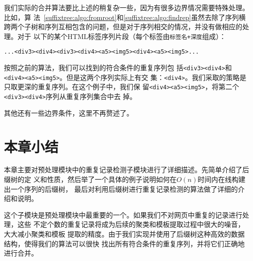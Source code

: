 我们实际的合并算法要比上述的稍复杂一些，因为有很多边界情况需要特殊处理。比如，算
法~\ref{suffixtree:algo:fromroot}和\ref{suffixtree:algo:findrep}虽然去除了序列横
跨两个子树和序列互相包含的问题，但是对于序列相交的情况，并没有做相应的处理。对于
以下的某个HTML标签序列片段（每个标签由\texttt{标签名+深度}组成）：
\begin{verbatim}
...<div3><div4><div3><div4><a5><img5><div4><a5><img5>...
\end{verbatim}
按照之前的算法，我们可以找到的符合条件的重复序列包
括\texttt{<div3><div4>}和\texttt{<div4><a5><img5>}。但是这两个序列实际上有交
集：\texttt{<div4>}。我们采取的策略是只取更深的重复序列。在这个例子中，我们保
留\texttt{<div4><a5><img5>}，将第二个\texttt{<div3><div4>}序列从重复序列集合中去
掉。

其他还有一些边界条件，这里不再赘述了。

\section{本章小结}
\label{sec:summarysuffixtree}
本章主要对预处理模块中的重复记录检测子模块进行了详细描述。先简单介绍了后缀树的定
义和性质，然后举了一个具体的例子说明如何在$O(n)$时间内在线构建出一个序列的后缀树，
最后对利用后缀树进行重复记录检测的算法做了详细的介绍和说明。

这个子模块是预处理模块中最重要的一个。如果我们不对网页中重复的记录进行处理，这些
不定个数的重复记录将成为后续的聚类和模板提取过程中很大的噪音，大大减小聚类和模板
提取的精度。由于我们实现并使用了后缀树这种高效的数据结构，使得我们的算法可以很快
找出所有符合条件的重复序列，并将它们正确地进行合并。

